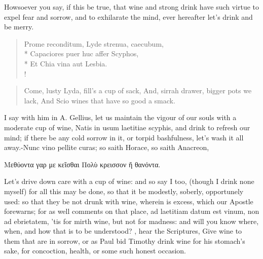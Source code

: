 Howsoever you say, if this be true, that wine and strong drink have
such virtue to expel fear and sorrow, and to exhilarate the mind, ever
hereafter let's drink and be merry.
%
%
\begin{latin}%
\begin{verse}%
Prome reconditum, Lyde strenua, caecubum,\\*
Capaciores puer huc affer Scyphos,\\*
Et Chia vina aut Lesbia.\\!
\end{verse}%
\end{latin}%
\translationrule%
\begin{verse}%
Come, lusty Lyda, fill's a cup of sack,
And, sirrah drawer, bigger pots we lack,
And Scio wines that have so good a smack.
\end{verse}%

I say with him in A. Gellius, let us maintain the vigour of our
souls with a moderate cup of wine, Natis in usum laetitiae
scyphis, and drink to refresh our mind; if there be any cold sorrow in
it, or torpid bashfulness, let's wash it all away.-Nunc vino pellite
curas; so saith Horace, so saith Anacreon,

\textgreek[variant=ancient]{Μεθύοντα γαρ με κεῖσθαι
Πολὺ κρεισσον ἤ θανόντα.}

Let's drive down care with a cup of wine: and so say I too, (though I
drink none myself) for all this may be done, so that it be modestly,
soberly, opportunely used: so that they be not drunk with wine, wherein
is excess, which our Apostle forewarns; for as \Chrysostom{} well
comments on that place, ad laetitiam datum est vinum, non ad
ebrietatem, 'tis for mirth wine, but not for madness: and will you know
where, when, and how that is to be understood? , hear the Scriptures, Give wine to
them that are in sorrow, or as Paul bid Timothy drink wine for his
stomach's sake, for concoction, health, or some such honest occasion.

